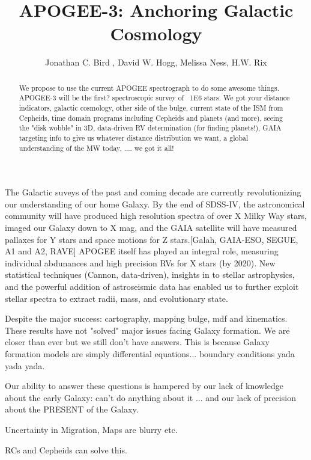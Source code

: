 \documentclass[11pt,preprint]{aastex}
\begin{document}
\title{APOGEE-3: Anchoring Galactic Cosmology}

\author{Jonathan C. Bird , David W. Hogg, Melissa Ness, H.W. Rix}


\begin{abstract}
We propose to use the current APOGEE spectrograph to do some awesome things. APOGEE-3 will be the first? spectroscopic survey of ~1E6 stars. We got your distance indicators, galactic cosmology, other side of the bulge, current state of the ISM from Cepheids, time domain programs including Cepheids and planets (and more), seeing the "disk wobble" in 3D, data-driven RV determination (for finding planets!), GAIA targeting info to give us whatever distance distribution we want, a global understanding of the MW today, .... we got it all!
\end{abstract}

The Galactic suveys of the past and coming decade are currently revolutionizing our understanding of our home Galaxy. By the end of SDSS-IV, the astronomical community will have produced high resolution spectra of over X Milky Way stars, imaged our Galaxy down to X mag, and the GAIA satellite will have measured pallaxes for Y stars and space motions for Z stars.[Galah, GAIA-ESO, SEGUE, A1 and A2, RAVE] APOGEE itself has played an integral role, measuring individual abdunances and high precision RVs for X stars (by 2020). New statistical techniques (Cannon, data-driven), insights in to stellar astrophysics, and the powerful addition of astroseismic data has enabled us to further exploit stellar spectra to extract radii, mass, and evolutionary state.

Despite the major success: cartography, mapping bulge, mdf and kinematics. These results have not "solved" major issues facing Galaxy formation. We are closer than ever but we still don't have answers. This is because Galaxy formation models are simply differential equations... boundary conditions yada yada yada.

Our ability to answer these questions is hampered by our lack of knowledge about the early Galaxy: can't do anything about it ... and our lack of precision about the PRESENT of the Galaxy. 

Uncertainty in Migration, Maps are blurry etc. 

RCs and Cepheids can solve this.
\end{document}
